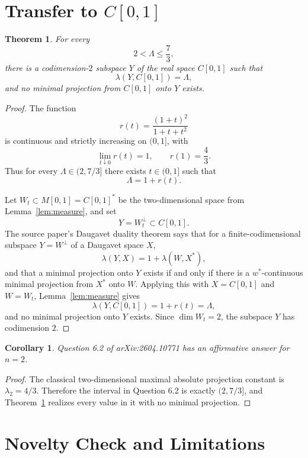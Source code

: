 \documentclass[11pt]{article}
\newtheorem{theorem}{Theorem}
\newtheorem{corollary}{Corollary}
\newcommand{\wstar}{w^*}
\begin{document}
\section*{Transfer to \(C[0,1]\)}

\begin{theorem}
\label{thm:main}
For every
\[
  2<\Lambda\leq \frac{7}{3},
\]
there is a codimension-\(2\) subspace \(Y\) of the real space \(C[0,1]\) such
that
\[
  \lambda(Y,C[0,1])=\Lambda,
\]
and no minimal projection from \(C[0,1]\) onto \(Y\) exists.
\end{theorem}

\begin{proof}
The function
\[
  r(t)=\frac{(1+t)^2}{1+t+t^2}
\]
is continuous and strictly increasing on \((0,1]\), with
\[
  \lim_{t\downarrow 0}r(t)=1,\qquad r(1)=\frac43.
\]
Thus for every \(\Lambda\in(2,7/3]\) there exists \(t\in(0,1]\) such that
\[
  \Lambda=1+r(t).
\]

Let \(W_t\subset M[0,1]=C[0,1]^*\) be the two-dimensional space from
Lemma~\ref{lem:measure}, and set
\[
  Y=W_t^\perp\subset C[0,1].
\]
The source paper's Daugavet duality theorem says that for a finite-codimensional
subspace \(Y=W^\perp\) of a Daugavet space \(X\),
\[
  \lambda(Y,X)=1+\lambda(W,X^*),
\]
and that a minimal projection onto \(Y\) exists if and only if there is a
\(\wstar\)-continuous minimal projection from \(X^*\) onto \(W\).  Applying
this with \(X=C[0,1]\) and \(W=W_t\), Lemma~\ref{lem:measure} gives
\[
  \lambda(Y,C[0,1])=1+r(t)=\Lambda,
\]
and no minimal projection onto \(Y\) exists.  Since \(\dim W_t=2\), the
subspace \(Y\) has codimension \(2\).
\end{proof}

\begin{corollary}
Question 6.2 of arXiv:2604.10771 has an affirmative answer for \(n=2\).
\end{corollary}

\begin{proof}
The classical two-dimensional maximal absolute projection constant is
\(\lambda_2=4/3\).  Therefore the interval in Question 6.2 is exactly
\((2,7/3]\), and Theorem~\ref{thm:main} realizes every value in it with no
minimal projection.
\end{proof}

\section*{Novelty Check and Limitations}
\end{document}
